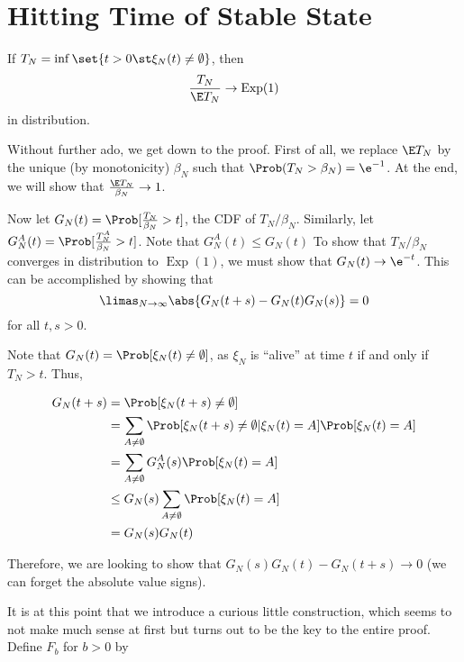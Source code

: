 \documentclass{scrartcl}
\DeclareMathOperator{\expDist}{Exp}
\begin{document}
\section{Hitting Time of Stable State}

\begin{theorem}
  If $T_{N} = \inf\set{t > 0 \st \xi_{N}(t) \neq \emptyset}$, then
  \[ \frac{T_{N}}{\E T_{N}} \to \expDist(1) \]
  in distribution.
\end{theorem}

Without further ado, we get down to the proof. First of all, we replace $\E T_{N}$ by the unique (by monotonicity) $\beta_{N}$ such that $\Prob(T_{N} > \beta_{N}) = \e^{-1}$. At the end, we will show that $\frac{\E T_{N}}{\beta_{N}} \to 1$.

Now let $G_{N}(t) = \Prob[\frac{T_{N}}{\beta_{N}} > t]$, the CDF of $T_{N}/\beta_{N}$. Similarly, let $G_{N}^{A}(t) = \Prob[\frac{T^{A}_{N}}{\beta_{N}} > t]$. Note that $G_{N}^{A}(t) \leq G_{N}(t)$ To show that $T_{N}/\beta_{N}$ converges in distribution to $\expDist(1)$, we must show that $G_{N}(t) \to \e^{-t}$. This can be accomplished by showing that
\[ \limas_{N \to \infty} \abs{G_{N}(t+s) - G_{N}(t)G_{N}(s)} = 0 \]
for all $t,s > 0$.

Note that $G_{N}(t) = \Prob[\xi_{N}(t) \neq \emptyset]$, as $\xi_{N}$ is ``alive'' at time $t$ if and only if $T_{N} > t$. Thus,

\begin{align*}
  G_{N}(t+s) &= \Prob[\xi_{N}(t+s) \neq \emptyset] \\
             &= \sum_{A \neq \emptyset} \Prob[\xi_{N}(t+s) \neq \emptyset | \xi_{N}(t) = A] \Prob[\xi_{N}(t) = A] \\
             &= \sum_{A \neq \emptyset} G_{N}^{A}(s) \Prob[\xi_{N}(t) = A] \\
             &\leq G_{N}(s) \sum_{A \neq \emptyset} \Prob[\xi_{N}(t) = A] \\
             &= G_{N}(s) G_{N}(t)
\end{align*}

Therefore, we are looking to show that $G_{N}(s) G_{N}(t) - G_{N}(t+s) \to 0$ (we can forget the absolute value signs).

It is at this point that we introduce a curious little construction, which seems to not make much sense at first but turns out to be the key to the entire proof. Define $F_{b}$ for $b > 0$ by
\end{document}
